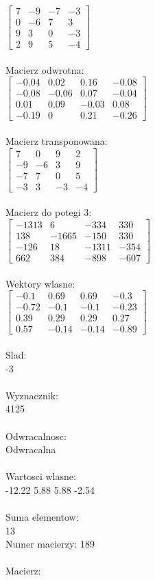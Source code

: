 \documentclass[a4paper,12pt]{article}
\begin{document}
$\begin{bmatrix} 7&-9&-7&-3\\0&-6&7&3\\9&3&0&-3\\2&9&5&-4 \end{bmatrix}$
\\
\\
Macierz odwrotna:\\

$\begin{bmatrix} -0.04&0.02&0.16&-0.08\\-0.08&-0.06&0.07&-0.04\\0.01&0.09&-0.03&0.08\\-0.19&0&0.21&-0.26 \end{bmatrix}$
\\
\\
Macierz transponowana:\\

$\begin{bmatrix} 7&0&9&2\\-9&-6&3&9\\-7&7&0&5\\-3&3&-3&-4 \end{bmatrix}$
\\
\\
Macierz do potegi 3:\\

$\begin{bmatrix} -1313&6&-334&330\\138&-1665&-150&330\\-126&18&-1311&-354\\662&384&-898&-607 \end{bmatrix}$
\\
\\
Wektory wlasne:\\

$\begin{bmatrix} -0.1&0.69&0.69&-0.3\\-0.72&-0.1&-0.1&-0.23\\0.39&0.29&0.29&0.27\\0.57&-0.14&-0.14&-0.89 \end{bmatrix}$
\\
\\
Slad:\\
-3
\\
\\
Wyznacznik:\\
4125
\\
\\
Odwracalnosc:\\
Odwracalna
\\
\\
Wartosci wlasne:\\
-12.22 5.88 5.88 -2.54
\\
\\
Suma elementow:\\
13
\\
\newpage
Numer macierzy:
189
\\
\\
Macierz:\\
\end{document}
